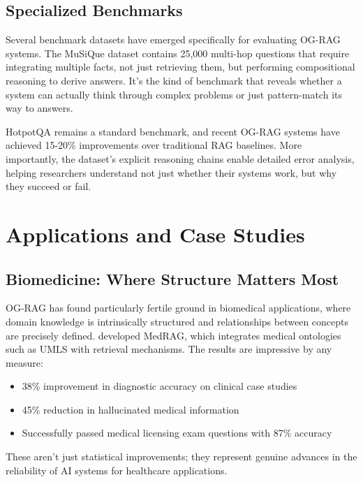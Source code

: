 \subsection{Specialized Benchmarks}

Several benchmark datasets have emerged specifically for evaluating OG-RAG systems. The MuSiQue dataset \citep{trivedi2022musique} contains 25,000 multi-hop questions that require integrating multiple facts, not just retrieving them, but performing compositional reasoning to derive answers. It's the kind of benchmark that reveals whether a system can actually think through complex problems or just pattern-match its way to answers.

HotpotQA \citep{yang2018hotpot} remains a standard benchmark, and recent OG-RAG systems have achieved 15-20\% improvements over traditional RAG baselines. More importantly, the dataset's explicit reasoning chains enable detailed error analysis, helping researchers understand not just whether their systems work, but why they succeed or fail.

\section{Applications and Case Studies}

\subsection{Biomedicine: Where Structure Matters Most}

OG-RAG has found particularly fertile ground in biomedical applications, where domain knowledge is intrinsically structured and relationships between concepts are precisely defined. \citet{jin2024medrag} developed MedRAG, which integrates medical ontologies such as UMLS with retrieval mechanisms. The results are impressive by any measure:

\begin{itemize}
\item 38\% improvement in diagnostic accuracy on clinical case studies
\item 45\% reduction in hallucinated medical information
\item Successfully passed medical licensing exam questions with 87\% accuracy
\end{itemize}

These aren't just statistical improvements; they represent genuine advances in the reliability of AI systems for healthcare applications.

